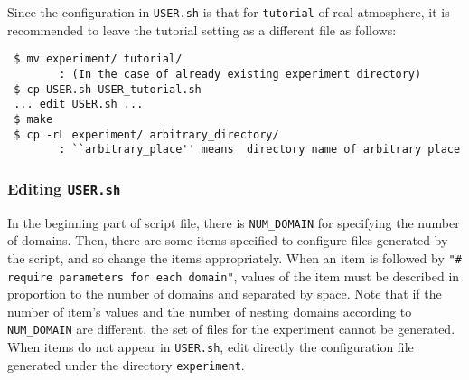 Since the configuration in \verb|USER.sh| is that for \verb|tutorial| of real atmosphere,
it is recommended to leave the tutorial setting as a different file as follows: 
\begin{verbatim}
 $ mv experiment/ tutorial/    
        : (In the case of already existing experiment directory)
 $ cp USER.sh USER_tutorial.sh
 ... edit USER.sh ...
 $ make
 $ cp -rL experiment/ arbitrary_directory/
        : ``arbitrary_place'' means  directory name of arbitrary place
\end{verbatim}


\subsubsection{Editing \texttt{USER.sh}}

In the beginning part of script file, there is \verb|NUM_DOMAIN| for specifying the number of domains.
Then, there are some items specified to configure files generated by the script,
and so change the items appropriately.
When an item is followed by \verb|"# require parameters for each domain"|,
values of the item must be described in proportion to the number of domains and separated by space. Note that if the number of item's values and the number of nesting domains according to \verb|NUM_DOMAIN| are different, the set of files for the experiment cannot be generated. When items do not appear in \verb|USER.sh|, edit directly the configuration file generated under the directory \verb|experiment|.
